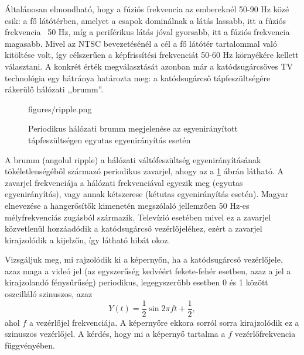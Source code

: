 Általánosan elmondható, hogy a fúziós frekvencia az embereknél 50-90 Hz közé esik: a fő látótérben, amelyet a csapok dominálnak a látás lassabb, itt a fúziós frekvencia ~50 Hz, míg a periférikus látás jóval gyorsabb, itt a fúziós frekvencia magasabb.
Mivel az NTSC bevezetésénél a cél a fő látótér tartalommal való kitöltése volt, így célszerűen a képfrissítési frekvenciát 50-60 Hz környékére kellett választani.
A konkrét érték megválasztását azonban már a katódsugárcsöves TV technológia egy hátránya határozta meg: a katódsugárcső tápfeszültségére rákerülő hálózati ,,brumm''.

\begin{figure}[]
	\centering
	\begin{overpic}[width = 1\columnwidth ]{figures/ripple.png}
	\end{overpic}
	\caption{Periodikus hálózati brumm megjelenése az egyenirányított tápfeszültségen egyutas egyenirányítás esetén}
	\label{Fig:ripple}
\end{figure}

\vspace{3mm}
A brumm (angolul ripple) a hálózati váltófeszültség egyenirányításának tökéletlenségéből származó periodikus zavarjel, ahogy az a \ref{Fig:ripple} ábrán látható.
A zavarjel frekvenciája a hálózati frekvenciával egyezik meg (egyutas egyenirányítás), vagy annak kétszerese (kétutas egyenirányítás esetén).
Magyar elnevezése a hangerősítők kimenetén megszólaló jellemzően 50 Hz-es mélyfrekvenciás zugásból származik.
Televízió esetében mivel ez a zavarjel közvetlenül hozzáadódik a katódsugárcső vezérlőjeléhez, ezért a zavarjel kirajzolódik a kijelzőn, így látható hibát okoz.

Vizsgáljuk meg, mi rajzolódik ki a képernyőn, ha a katódsugárcső vezérlőjele, azaz maga a videó jel (az egyszerűség kedvéért fekete-fehér esetben, azaz a jel a kirajzolandó fénysűrűség) periodikus, legegyszerűbb esetben 0 és 1 között oszcilláló szinuszos, azaz
\begin{equation}
Y(t) = \frac{1}{2} \sin 2 \pi f t + \frac{1}{2},
\end{equation}
ahol $f$ a vezérlőjel frekvenciája.
A képernyőre ekkora sorról sorra kirajzolódik ez a szinuszos vezérlőjel.
A kérdés, hogy mi a képernyő tartalma a $f$ vezérlőfrekvencia függvényében.

